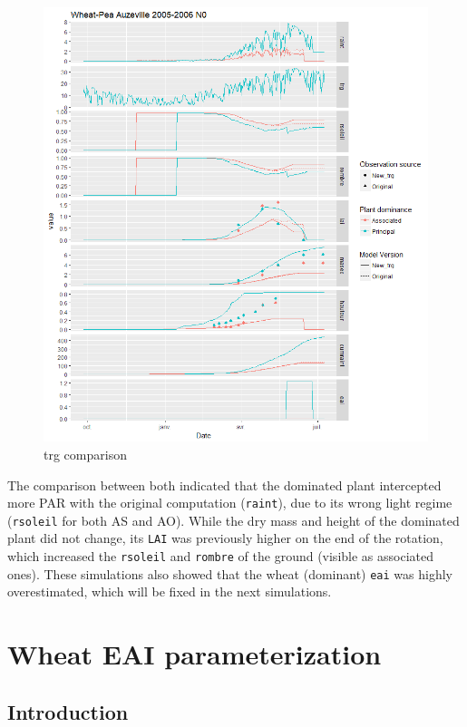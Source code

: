 \documentclass[
]{book}
\begin{document}
\begin{figure}
\centering
\includegraphics{img/trg-computation.png}
\caption{\label{fig:trgcomparison1}trg comparison}
\end{figure}

The comparison between both indicated that the dominated plant intercepted more PAR with the original computation (\texttt{raint}), due to its wrong light regime (\texttt{rsoleil} for both AS and AO). While the dry mass and height of the dominated plant did not change, its \texttt{LAI} was previously higher on the end of the rotation, which increased the \texttt{rsoleil} and \texttt{rombre} of the ground (visible as associated ones).
These simulations also showed that the wheat (dominant) \texttt{eai} was highly overestimated, which will be fixed in the next simulations.

\hypertarget{eai}{%
\chapter{Wheat EAI parameterization}\label{eai}}

\hypertarget{introduction-1}{%
\section{Introduction}\label{introduction-1}}
\end{document}
